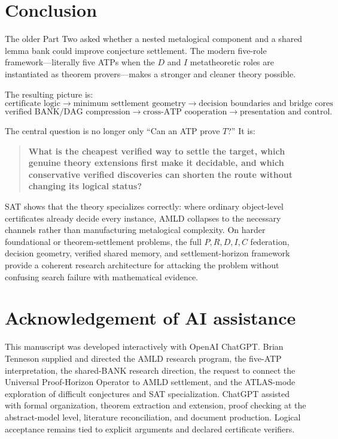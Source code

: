 \documentclass[11pt]{article}
\theoremstyle{remark}
\begin{document}
\section{Conclusion}

The older Part Two asked whether a nested metalogical component and a shared lemma bank could improve conjecture settlement. The modern five-role framework---literally five ATPs when the $D$ and $I$ metatheoretic roles are instantiated as theorem provers---makes a stronger and cleaner theory possible.

The resulting picture is:
\[
\boxed{\text{certificate logic}}
\longrightarrow
\boxed{\text{minimum settlement geometry}}
\longrightarrow
\boxed{\text{decision boundaries and bridge cores}}
\]
\[
\boxed{\text{verified BANK/DAG compression}}
\longrightarrow
\boxed{\text{cross-ATP cooperation}}
\longrightarrow
\boxed{\text{presentation and control}}.
\]

The central question is no longer only ``Can an ATP prove $T$?'' It is:

\begin{quote}
\textbf{What is the cheapest verified way to settle the target, which genuine theory extensions first make it decidable, and which conservative verified discoveries can shorten the route without changing its logical status?}
\end{quote}

SAT shows that the theory specializes correctly: where ordinary object-level certificates already decide every instance, AMLD collapses to the necessary channels rather than manufacturing metalogical complexity. On harder foundational or theorem-settlement problems, the full $P,R,D,I,C$ federation, decision geometry, verified shared memory, and settlement-horizon framework provide a coherent research architecture for attacking the problem without confusing search failure with mathematical evidence.

\section*{Acknowledgement of AI assistance}
This manuscript was developed interactively with OpenAI ChatGPT. Brian Tenneson supplied and directed the AMLD research program, the five-ATP interpretation, the shared-BANK research direction, the request to connect the Universal Proof-Horizon Operator to AMLD settlement, and the ATLAS-mode exploration of difficult conjectures and SAT specialization. ChatGPT assisted with formal organization, theorem extraction and extension, proof checking at the abstract-model level, literature reconciliation, and document production. Logical acceptance remains tied to explicit arguments and declared certificate verifiers.
\end{document}
